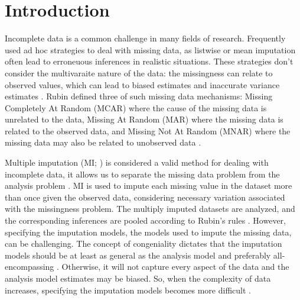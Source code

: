 \documentclass[10pt, a4paper, titlepage]{article}
\begin{document}
\newpage

\section{Introduction}

Incomplete data is a common challenge in many fields of research. Frequently used ad hoc strategies to deal with missing data, as listwise or mean imputation often lead to erroneuous inferences in realistic situations. These strategies don't consider the multivaraite nature of the data: the missingness can relate to observed values, which can lead to biased estimates and inaccurate variance estimates \citep{buurenFlexibleImputationMissing2018, kang2013, enders2017, austin2021}. Rubin defined three of such missing data mechanisms: Missing Completely At Random (MCAR) where the cause of the missing data is unrelated to the data, Missing At Random (MAR) where the missing data is related to the observed data, and Missing Not At Random (MNAR) where the missing data may also be related to unobserved data \citep{rubin1976}.

Multiple imputation (MI; \citealt{rubin1987}) is considered a valid method for dealing with incomplete data, it allows us to separate the missing data problem from the analysis problem \citep{mistlerComparisonJointModel2017, buurenFlexibleImputationMissing2018, enders2017, burgette2010, austin2021, audigier2018, vanbuuren2007, grund2021, hughes2014}. MI is used to impute each missing value in the dataset more than once given the observed data, considering necessary variation associated with the missingness problem. The multiply imputed datasets are analyzed, and the corresponding inferences are pooled according to Rubin's rules \citep{buurenFlexibleImputationMissing2018, austin2021, rubin1987, carpenter2013}. However, specifying the imputation models, the models used to impute the missing data, can be challenging. The concept of congeniality dictates that the imputation models should be at least as general as the analysis model and preferably all-encompassing \citep{grund2018, enders2018, meng1994multiple, bartlett2015, grund2016}. Otherwise, it will not capture every aspect of the data and the analysis model estimates may be biased. So, when the complexity of data increases, specifying the imputation models becomes more difficult \citep{grund2018, buurenFlexibleImputationMissing2018}.
\end{document}
